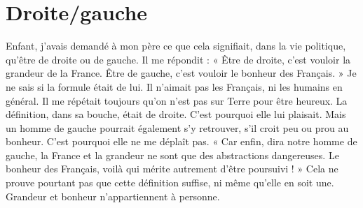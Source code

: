 \section{Droite/gauche}
Enfant, j'avais demandé à mon père ce que cela signifiait,
dans la vie politique, qu'être de droite ou de
gauche. Il me répondit : « Être de droite, c’est vouloir la grandeur de la France.
Être de gauche, c’est vouloir le bonheur des Français. » Je ne sais si la formule
était de lui. Il n’aimait pas les Français, ni les humains en général. Il me répétait
toujours qu’on n’est pas sur Terre pour être heureux. La définition, dans sa
bouche, était de droite. C’est pourquoi elle lui plaisait. Mais un homme de
gauche pourrait également s’y retrouver, s’il croit peu ou prou au bonheur.
C’est pourquoi elle ne me déplaît pas. « Car enfin, dira notre homme de
gauche, la France et la grandeur ne sont que des abstractions dangereuses. Le
bonheur des Français, voilà qui mérite autrement d’être poursuivi ! » Cela ne
prouve pourtant pas que cette définition suffise, ni même qu’elle en soit une.
Grandeur et bonheur n’appartiennent à personne.

